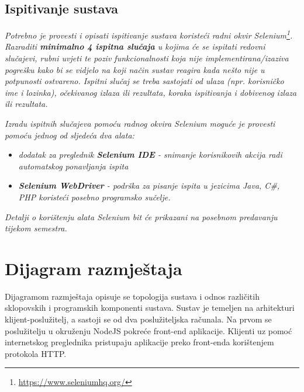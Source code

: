 			
			
			\subsection{Ispitivanje sustava}
			
			 \textit{Potrebno je provesti i opisati ispitivanje sustava koristeći radni okvir Selenium\footnote{\url{https://www.seleniumhq.org/}}. Razraditi \textbf{minimalno 4 ispitna slučaja} u kojima će se ispitati redovni slučajevi, rubni uvjeti te poziv funkcionalnosti koja nije implementirana/izaziva pogrešku kako bi se vidjelo na koji način sustav reagira kada nešto nije u potpunosti ostvareno. Ispitni slučaj se treba sastojati od ulaza (npr. korisničko ime i lozinka), očekivanog izlaza ili rezultata, koraka ispitivanja i dobivenog izlaza ili rezultata.\\ }
			 
			 \textit{Izradu ispitnih slučajeva pomoću radnog okvira Selenium moguće je provesti pomoću jednog od sljedeća dva alata:}
			 \begin{itemize}
			 	\item \textit{dodatak za preglednik \textbf{Selenium IDE} - snimanje korisnikovih akcija radi automatskog ponavljanja ispita	}
			 	\item \textit{\textbf{Selenium WebDriver} - podrška za pisanje ispita u jezicima Java, C\#, PHP koristeći posebno programsko sučelje.}
			 \end{itemize}
		 	\textit{Detalji o korištenju alata Selenium bit će prikazani na posebnom predavanju tijekom semestra.}
			
			\eject 
		
		
		\section{Dijagram razmještaja}
			
			
			 Dijagramom razmještaja opisuje se topologija sustava i odnos različitih sklopovskih i programskih komponenti sustava. Sustav je temeljen na arhitekturi klijent-poslužitelj, a sastoji se od dva poslužiteljska računala. Na prvom se poslužitelju u okruženju NodeJS pokreće front-end aplikacije. Klijenti uz pomoć internetskog preglednika pristupaju aplikacije preko front-enda korištenjem protokola HTTP.
			 
